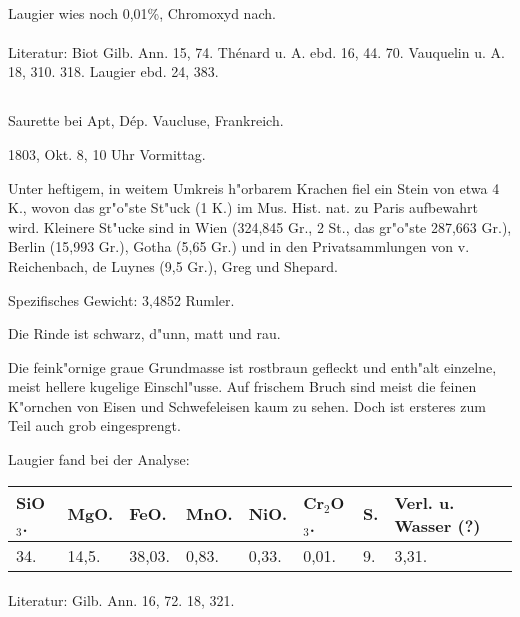 \documentclass[a4paper, 11pt, oneside]{article}
\begin{document}
\paragraph{}
Laugier wies noch 0,01\%, Chromoxyd nach.
\normalsize
\paragraph{}
Literatur: Biot Gilb. Ann. 15, 74. Thénard u. A. ebd. 16, 44. 70. Vauquelin u. A. 18, 310. 318. Laugier ebd. 24, 383.
\subsection{}
\LARGE
\paragraph{}
Saurette bei Apt, Dép. Vaucluse, Frankreich.

1803, Okt. 8, 10 Uhr Vormittag.

Unter heftigem, in weitem Umkreis h"orbarem Krachen fiel ein Stein von etwa 4 K., wovon das gr"o"ste St"uck (1 K.) im Mus. Hist. nat. zu Paris aufbewahrt wird. Kleinere St"ucke sind in Wien (324,845 Gr., 2 St., das gr"o"ste 287,663 Gr.), Berlin (15,993 Gr.), Gotha (5,65 Gr.) und in den Privatsammlungen von v. Reichenbach, de Luynes (9,5 Gr.), Greg und Shepard.

Spezifisches Gewicht: 3,4852 Rumler.

Die Rinde ist schwarz, d"unn, matt und rau.

Die feink"ornige graue Grundmasse ist rostbraun gefleckt und enth"alt einzelne, meist hellere kugelige Einschl"usse. Auf frischem Bruch sind meist die feinen K"ornchen von Eisen und Schwefeleisen kaum zu sehen. Doch ist ersteres zum Teil auch grob eingesprengt.

Laugier fand bei der Analyse:
\begin{table}[!ht]
    \centering\swabfamily\Large
    \normalsize
    \begin{tabular}{l l l l l l l l}
        SiO$_{3}$. & MgO. & FeO. & MnO. & NiO. & Cr$_{2}$O$_{3}$. & S. & Verl. u. Wasser (?) \\ \hline
        34. & 14,5. & 38,03. & 0,83. & 0,33. & 0,01. & 9. & 3,31. \\
    \end{tabular}
\end{table}
\normalsize
\paragraph{}
Literatur: Gilb. Ann. 16, 72. 18, 321.
\end{document}
